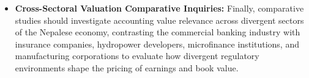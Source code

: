 \begin{itemize}
    Building upon the panel findings of this study, future inquiries could employ high-frequency, intraday event-study methodologies to capture the immediate market reaction surrounding statutory board dividend announcements, AGM approvals, and quarterly earnings releases, quantifying the speed and informational efficiency of NEPSE's price discovery mechanism.
    \item \textbf{Cross-Sectoral Valuation Comparative Inquiries:}
    Finally, comparative studies should investigate accounting value relevance across divergent sectors of the Nepalese economy, contrasting the commercial banking industry with insurance companies, hydropower developers, microfinance institutions, and manufacturing corporations to evaluate how divergent regulatory environments shape the pricing of earnings and book value.
\end{itemize}

